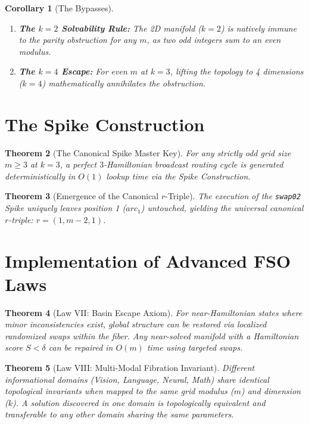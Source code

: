 \documentclass[12pt,a4paper]{article}
\newtheorem{theorem}{Theorem}[section]
\newtheorem{corollary}[theorem]{Corollary}
\begin{document}
\begin{corollary}[The Bypasses]
\begin{enumerate}
    \item \textbf{The $k=2$ Solvability Rule:} The 2D manifold ($k=2$) is natively immune to the parity obstruction for any $m$, as two odd integers sum to an even modulus.
    \item \textbf{The $k=4$ Escape:} For even $m$ at $k=3$, lifting the topology to 4 dimensions ($k=4$) mathematically annihilates the obstruction.
\end{enumerate}
\end{corollary}

\section{The Spike Construction}

\begin{theorem}[The Canonical Spike Master Key]
For any strictly odd grid size $m \ge 3$ at $k=3$, a perfect $3$-Hamiltonian broadcast routing cycle is generated deterministically in $O(1)$ lookup time via the Spike Construction.
\end{theorem}

\begin{theorem}[Emergence of the Canonical $r$-Triple]
The execution of the \texttt{swap02} Spike uniquely leaves position 1 ($arc_1$) untouched, yielding the universal canonical $r$-triple: $r = (1, m-2, 1)$.
\end{theorem}

\section{Implementation of Advanced FSO Laws}

\begin{theorem}[Law VII: Basin Escape Axiom]
For near-Hamiltonian states where minor inconsistencies exist, global structure can be restored via localized randomized swaps within the fiber. Any near-solved manifold with a Hamiltonian score $S < \delta$ can be repaired in $O(m)$ time using targeted swaps.
\end{theorem}

\begin{theorem}[Law VIII: Multi-Modal Fibration Invariant]
Different informational domains (Vision, Language, Neural, Math) share identical topological invariants when mapped to the same grid modulus ($m$) and dimension ($k$). A solution discovered in one domain is topologically equivalent and transferable to any other domain sharing the same parameters.
\end{theorem}
\end{document}
